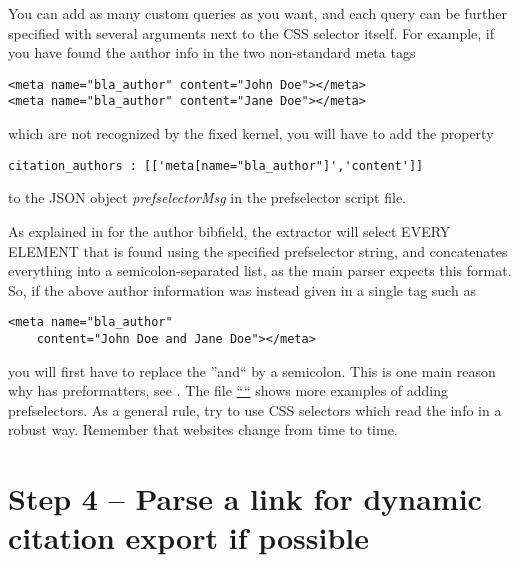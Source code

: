 \documentclass[
a4paper,
12pt,
]
{article}
\begin{document}
You can add as many custom queries as you want, and each query can be further specified with several arguments next to the CSS selector itself. For example, if you have found the author info in the two non-standard meta tags
\begin{center}
\begin{lstlisting}
<meta name="bla_author" content="John Doe"></meta>
<meta name="bla_author" content="Jane Doe"></meta>
\end{lstlisting}
\end{center}
which are not recognized by the fixed kernel, you will have to add the property
\begin{center}
\begin{lstlisting}
citation_authors : [['meta[name="bla_author"]','content']]
\end{lstlisting}
\end{center}
to the JSON object \textit{prefselectorMsg} in the prefselector script file.\par
As explained in  for the author bibfield, the extractor will select EVERY ELEMENT that is found using the specified prefselector string, and concatenates everything into a semicolon-separated list, as the main parser expects this format. So, if the above author information was instead given in a single tag such as
\begin{center}
\begin{lstlisting}
<meta name="bla_author" 
	content="John Doe and Jane Doe"></meta>
\end{lstlisting}
\end{center}
you will first have to replace the ''and`` by a semicolon. This is one main reason why {\plgname} has preformatters, see .
The file \href{https://github.com/Langenscheiss/bibitnow/blob/master/extractors/prefselectors/0_EXAMPLE.js}{``\exmpl``} shows more examples of adding prefselectors. As a general rule, try to use CSS selectors which read the info in a robust way. Remember that websites change from time to time.

\section{Step 4 -- Parse a link for dynamic citation export if possible}\label{sec_4}
\end{document}
